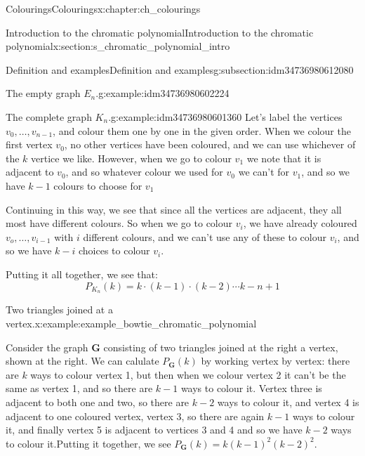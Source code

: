 \documentclass[oneside,10pt,]{book}
\numberwithin{equation}{section}
\newcommand{\bfG}{\mathbf{G}}
\begin{document}
\begin{chapterptx}{Colourings}{}{Colourings}{}{}{x:chapter:ch_colourings}
\begin{sectionptx}{Introduction to the chromatic polynomial}{}{Introduction to the chromatic polynomial}{}{}{x:section:s_chromatic_polynomial_intro}
\begin{subsectionptx}{Definition and examples}{}{Definition and examples}{}{}{g:subsection:idm34736980612080}
\begin{example}{The empty graph \(E_n\).}{g:example:idm34736980602224}
\end{example}
\begin{example}{The complete graph \(K_n\).}{g:example:idm34736980601360}%
Let's label the vertices \(v_0,\dots, v_{n-1}\), and colour them one by one in the given order.  When we colour the first vertex \(v_0\), no other vertices have been coloured, and we can use whichever of the \(k\) vertice we like.  However, when we go to colour \(v_1\) we note that it is adjacent to \(v_0\), and so whatever colour we used for \(v_0\) we can't for \(v_1\), and so we have \(k-1\) colours to choose for \(v_1\)%
\par
Continuing in this way, we see that since all the vertices are adjacent, they all most have different colours.  So when we go to colour \(v_i\), we have already coloured \(v_o,\dots, v_{i-1}\) with \(i\) different colours, and we can't use any of these to colour \(v_i\), and so we have \(k-i\) choices to colour \(v_i\).%
\par
Putting it all together, we see that:%
\begin{equation*}
P_{K_n}(k)=k\cdot (k-1)\cdot (k-2)\cdots k-n+1
\end{equation*}
%
\end{example}
\begin{example}{Two triangles joined at a vertex.}{x:example:example_bowtie_chromatic_polynomial}%
\begin{sidebyside}{2}{0.025}{0.025}{0.05}%
\begin{sbspanel}{0.6}%
Consider the graph \(\bfG\) consisting of two triangles joined at the right a vertex, shown at the right.  We can calulate \(P_\bfG(k)\) by working vertex by vertex: there are \(k\) ways to colour vertex 1, but then when we colour vertex 2 it can't be the same as vertex 1, and so there are \(k-1\) ways to colour it.  Vertex three is adjacent to both one and two, so there are \(k-2\) ways to colour it, and vertex 4 is adjacent to one coloured vertex, vertex 3, so there are again \(k-1\) ways to colour it, and finally vertex 5 is adjacent to vertices 3 and 4 and so we have \(k-2\) ways to colour it.Putting it together, we see \(P_\bfG(k)=k(k-1)^2(k-2)^2\).%
\end{sbspanel}%
\begin{sbspanel}{0.3}%
\end{sbspanel}
\end{sidebyside}
\end{example}
\end{subsectionptx}
\end{sectionptx}
\end{chapterptx}
\end{document}

